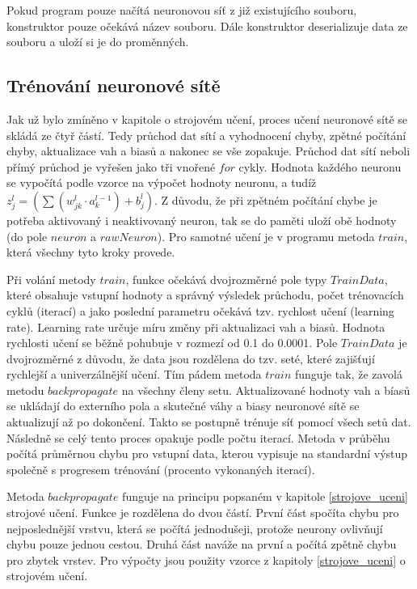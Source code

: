 Pokud program pouze načítá neuronovou síť z již existujícího souboru, konstruktor pouze očekává název souboru.
Dále konstruktor deserializuje data ze souboru a uloží si je do proměnných.

\subsection{Trénování neuronové sítě}
Jak už bylo zmíněno v kapitole o strojovém učení, proces učení neuronové sítě se skládá ze čtyř částí. Tedy průchod dat sítí a vyhodnocení chyby,
zpětné počítání chyby, aktualizace vah a biasů a nakonec se vše zopakuje. Průchod dat sítí neboli přímý průchod je vyřešen jako tři vnořené \(for\) cykly.
Hodnota každého neuronu se vypočítá podle vzorce na výpočet hodnoty neuronu, a tudíž \(z_{j}^{l} = \left( \sum (w^{l}_{jk} \cdot a^{l-1}_k) + b^l_j \right)\).
Z důvodu, že při zpětném počítání chybe je potřeba aktivovaný i neaktivovaný neuron, tak se do paměti uloží obě hodnoty (do pole \(neuron\) a \(rawNeuron\)).
Pro samotné učení je v programu metoda \(train\), která všechny tyto kroky provede.

Při volání metody \(train\), funkce očekává dvojrozměrné pole typy \(TrainData\), které obsahuje vstupní hodnoty a správný výsledek průchodu,
počet trénovacích cyklů (iterací) a jako poslední parametru očekává tzv. rychlost učení (learning rate).
Learning rate určuje míru změny při aktualizaci vah a biasů. Hodnota rychlosti učení se běžně pohubuje v rozmezí od 0.1 do 0.0001.
Pole \(TrainData\) je dvojrozměrné z důvodu, že data jsou rozdělena do tzv. seté, které zajišťují rychlejší a univerzálnější učení.
Tím pádem metoda \(train\) funguje tak, že zavolá metodu \(backpropagate\) na všechny členy setu.
Aktualizované hodnoty vah a bíasů se ukládají do externího pola a skutečné váhy a biasy neuronové sítě se aktualizují až po dokončení.
Takto se postupně trénuje síť pomocí všech setů dat. Následně se celý tento proces opakuje podle počtu iterací.
Metoda v průběhu počítá průměrnou chybu pro vstupní data, kterou vypisuje na standardní výstup společně s progresem trénování (procento vykonaných iterací).

Metoda \(backpropagate\) funguje na principu popsaném v kapitole \ref{strojove_uceni} strojové učení. Funkce je rozdělena do dvou částí.
První část spočíta chybu pro nejposlednější vrstvu, která se počítá jednodušeji, protože neurony ovlivňují chybu pouze jednou cestou.
Druhá část naváže na první a počítá zpětně chybu pro zbytek vrstev. Pro výpočty jsou použity vzorce z kapitoly \ref{strojove_uceni} o strojovém učení.

